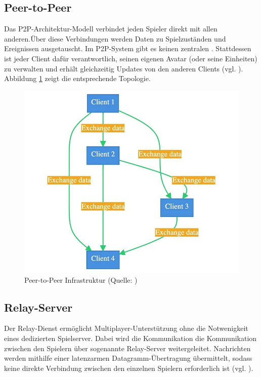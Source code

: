 \subsection{Peer-to-Peer}
Das \ac{P2P}-Architektur-Modell verbindet jeden Spieler direkt mit allen anderen.Über diese Verbindungen werden Daten zu Spielzuständen und Ereignissen ausgetauscht. Im  \ac{P2P}-System gibt es keinen zentralen . Stattdessen ist jeder Client dafür verantwortlich, seinen eigenen Avatar (oder seine Einheiten) zu verwalten und erhält gleichzeitig Updates von den anderen Clients (vgl. \cite{mygames_unity_2024}). Abbildung \ref{fig:p-2-p} zeigt die entsprechende Topologie.

\begin{figure}[ht]
\centering
\includegraphics[width=1\linewidth]{content/pictures/0_poGQC2fWQ3tPWPwT.png}
\caption{Peer-to-Peer Infrastruktur (Quelle: \cite{mygames_unity_2024})}
\label{fig:p-2-p}
\end{figure}


\subsection{Relay-Server}
Der Relay-Dienst ermöglicht Multiplayer-Unterstützung ohne die Notwenigkeit eines dedizierten Spielserver. Dabei wird die Kommunikation die Kommunikation zwischen den Spielern über sogenannte Relay-Server weitergeleitet. Nachrichten werden mithilfe einer latenzarmen Datagramm-Übertragung übermittelt, sodass keine direkte Verbindung zwischen den einzelnen Spielern erforderlich ist (vgl. \cite{noauthor_relay_nodate}).

